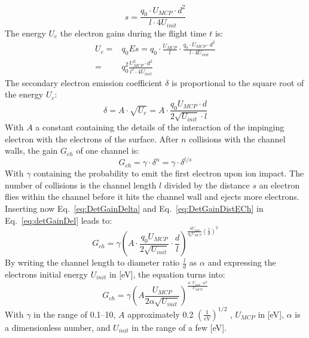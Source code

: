 	\begin{equation}
		s = \frac{q_0 \cdot U_{MCP}\cdot d^2}{l\cdot 4U_{init}}
		\label{eq:DetGainDistECh}
	\end{equation}
	The energy $U_c$ the electron gains during the flight time $t$ is:
	\begin{align}
		U_c =& q_0 Es = q_0\cdot \frac{U_{MCP}}{l}\cdot\frac{q_0\cdot U_{MCP}\cdot d^2}{l\cdot 4 U_{init}}\\
		=& q_0^2 \frac{U_{MCP}^2\cdot d^2}{l^2\cdot 4U_{init}}
	\end{align}
	The secondary electron emission coefficient $\delta$ is proportional to the square root of the energy $U_c$:
	\begin{equation}
		\delta = A\cdot \sqrt{U_c} = A\cdot \frac{q_0 U_{MCP}\cdot d}{2 \sqrt{U_{init}}\cdot l}
		\label{eq:DetGainDelta}
	\end{equation}
	With $A$ a constant containing the details of the interaction of the impinging electron with the electrons of the surface. After $n$ collisions with the channel walls, the gain $G_{ch}$ of one channel is:
	\begin{equation}
		G_{ch} = \gamma\cdot\delta^{n} = \gamma\cdot\delta^{l/s}
		\label{eq:detGainDel}
	\end{equation}
	With $\gamma$ containing the probability to emit the first electron upon ion impact. The number of collisions is the channel length $l$ divided by the distance $s$ an electron flies within the channel before it hits the channel wall and ejects more electrons. Inserting now Eq.~\eqref{eq:DetGainDelta} and Eq.~\eqref{eq:DetGainDistECh} in Eq.~\eqref{eq:detGainDel} leads to:
	\begin{equation}
		G_{ch} = \gamma\left(A\cdot\frac{q_0 U_{MCP}}{2\sqrt{U_{init}}}\cdot\frac{d}{l}\right) ^{\frac{4U_{init}}{q_0 U_{MCP}}\left(\frac{l}{d}\right)^2}
	\end{equation}
	By writing the channel length to diameter ratio $\frac{l}{d}$ as $\alpha$ and expressing the electrons initial energy $U_{init}$ in [eV], the equation turns into:
	\begin{equation}
		G_{ch} = \gamma\left(A\frac{U_{MCP}}{2\alpha\sqrt{U_{init}}}\right)^{\frac{4\cdot U_{init}\cdot\alpha^2}{U_{MCP}}}
		\label{eq:MCPGain}
	\end{equation}
	With $\gamma$ in the range of 0.1--10, $A$ approximately 0.2 $\left(\frac{1}{eV}\right)^{1/2}$ \cite{Wiza_1979_MCP}, $U_{MCP}$ in [eV], $\alpha$ is a dimensionless number, and $U_{init}$ in the range of a few [eV].
	
